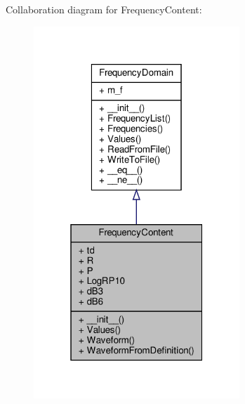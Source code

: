 Collaboration diagram for Frequency\+Content\+:\nopagebreak
\begin{figure}[H]
\begin{center}
\leavevmode
\includegraphics[width=220pt]{classSignalIntegrity_1_1FrequencyDomain_1_1FrequencyContent_1_1FrequencyContent__coll__graph}
\end{center}
\end{figure}
